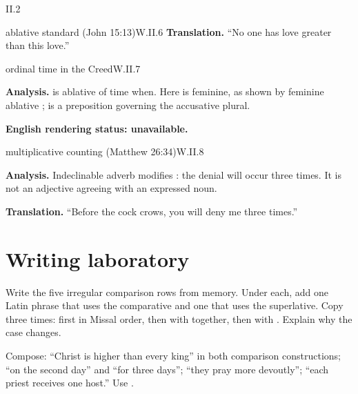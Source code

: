 \begin{courseunit}{II.2}
\begin{workedexample}{ablative standard (John 15:13)}{W.II.6}
\textbf{Translation.}  ``No one has love greater than this love.''
\end{workedexample}

\begin{workedexample}{ordinal time in the Creed}{W.II.7}

\textbf{Analysis.}   is ablative of time when. Here
 is feminine, as shown by feminine ablative ;
 is a preposition governing the
accusative plural.

\textbf{English rendering status: unavailable.}
\end{workedexample}

\begin{workedexample}{multiplicative counting (Matthew 26:34)}{W.II.8}

\textbf{Analysis.}  Indeclinable adverb  modifies : the denial will
occur three times.  It is not an adjective agreeing with an expressed noun.

\textbf{Translation.}  ``Before the cock crows, you will deny me three times.''
\end{workedexample}

\section{Writing laboratory}

Write the five irregular comparison rows from memory.  Under each, add one Latin phrase that
uses the comparative and one that uses the superlative.  Copy  three times: first in Missal order, then with  together, then
with .  Explain why the case changes.

Compose: ``Christ is higher than every king'' in both comparison constructions; ``on the
second day'' and ``for three days''; ``they pray more devoutly''; ``each priest receives one
host.''  Use .



\end{courseunit}

